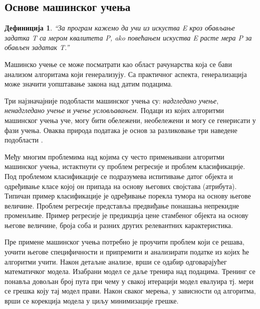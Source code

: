 \documentclass[a4paper]{article}
\newtheorem{definic}{Дефиниција}
\begin{document}
{\subsection{Основе машинског учења}
\begin{definic}
``За програм кажемо да учи из искуства E кроз обављање задатка T са мером квалитета P, ako повећањем искуства E расте мера P за обављен задатак T.''
\\[5pt]
\end{definic}


Машинско учење се може посматрати као област рачунарства која се бави анализом алгоритама који генерализују. Са практичног аспекта, генерализација може значити уопштавање закона над датим подацима.


Три најзначајније подобласти машинског учења су: \textit{надгледано учење}, \textit{ненадгледано учење} и \textit{учење условљавањем}. Подаци из којих алгоритми машинског учења уче, могу бити обележени, необележени и могу се генерисати у фази учења. Оваква природа података је основ за разликовање три наведене подобласти \cite{tom-ml}.


Међу многим проблемима над којима су често примењивани алгоритми машинског учења, истактнути су проблем регресије и проблем класификације. Под проблемом класификације се подразумева испитивање датог објекта и одређивање класе којој он припада на основу његових својстава (атрибута). Типичан пример класификације је одређивање порекла тумора на основу његове величине. Проблем регресије представља предвиђање понашања непрекидне променљиве. Пример регресије је предикција цене стамбеног објекта на основу његове величине, броја соба и разних других релевантних карактеристика.


Пре примене машинског учења потребно је проучити проблем који се решава, уочити његове специфичности и припремити и анализирати податке из којих ће алгоритми учити. Након детаљне анализе, врши се одабир одговарајућег математичког модела. Изабрани модел се даље тренира над подацима. Тренинг се понавља довољан број пута при чему у свакој итерацији модел евалуира тј. мери се грешка коју тај модел прави. Након сваког мерења, у зависности од алгоритма, врши се корекција модела у циљу минимизације грешке.
 


}
\end{document}
